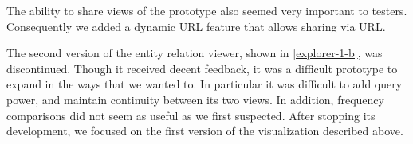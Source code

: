 The ability to share views of the prototype also seemed very important to testers. Consequently we added a dynamic URL feature that allows sharing via URL.

The second version of the entity relation viewer, shown in \ref{explorer-1-b}, was discontinued. Though it received decent feedback, it was a difficult prototype to expand in the ways that we wanted to. In particular it was difficult to add query power, and maintain continuity between its two views. In addition, frequency comparisons did not seem as useful as we first suspected. After stopping its development, we focused on the first version of the visualization described above.
